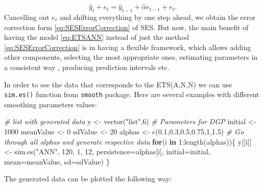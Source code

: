 \documentclass[
]{book}
\newenvironment{Shaded}{\begin{snugshade}}{\end{snugshade}}
\newcommand{\AttributeTok}[1]{\textcolor[rgb]{0.77,0.63,0.00}{#1}}
\newcommand{\CommentTok}[1]{\textcolor[rgb]{0.56,0.35,0.01}{\textit{#1}}}
\newcommand{\ControlFlowTok}[1]{\textcolor[rgb]{0.13,0.29,0.53}{\textbf{#1}}}
\newcommand{\DecValTok}[1]{\textcolor[rgb]{0.00,0.00,0.81}{#1}}
\newcommand{\FloatTok}[1]{\textcolor[rgb]{0.00,0.00,0.81}{#1}}
\newcommand{\FunctionTok}[1]{\textcolor[rgb]{0.00,0.00,0.00}{#1}}
\newcommand{\NormalTok}[1]{#1}
\newcommand{\OtherTok}[1]{\textcolor[rgb]{0.56,0.35,0.01}{#1}}
\newcommand{\SpecialCharTok}[1]{\textcolor[rgb]{0.00,0.00,0.00}{#1}}
\newcommand{\StringTok}[1]{\textcolor[rgb]{0.31,0.60,0.02}{#1}}
\theoremstyle{definition}
\theoremstyle{definition}
\theoremstyle{definition}
\theoremstyle{definition}
\theoremstyle{remark}
\begin{document}
\begin{equation}
    \hat{y}_t + e_t = \hat{y}_{t-1} + \hat{\alpha} e_{t-1} + e_t .
  \label{eq:ETSANNEstimation2}
\end{equation}
Cancelling out \(e_t\) and shifting everything by one step ahead, we obtain the error correction form \eqref{eq:SESErrorCorrection} of SES. But now, the main benefit of having the model \eqref{eq:ETSANN} instead of just the method \eqref{eq:SESErrorCorrection} is in having a flexible framework, which allows adding other components, selecting the most appropriate ones, estimating parameters in a consistent way \citep[see Section 4.3 of][]{SvetunkovSBA}, producing prediction intervals etc.

In order to see the data that corresponds to the ETS(A,N,N) we can use \texttt{sim.es()} function from \texttt{smooth} package. Here are several examples with different smoothing parameters values:

\begin{Shaded}
\begin{Highlighting}[]
\CommentTok{\# list with generated data}
\NormalTok{y }\OtherTok{\textless{}{-}} \FunctionTok{vector}\NormalTok{(}\StringTok{"list"}\NormalTok{,}\DecValTok{6}\NormalTok{)}
\CommentTok{\# Parameters for DGP}
\NormalTok{initial }\OtherTok{\textless{}{-}} \DecValTok{1000}
\NormalTok{meanValue }\OtherTok{\textless{}{-}} \DecValTok{0}
\NormalTok{sdValue }\OtherTok{\textless{}{-}} \DecValTok{20}
\NormalTok{alphas }\OtherTok{\textless{}{-}} \FunctionTok{c}\NormalTok{(}\FloatTok{0.1}\NormalTok{,}\FloatTok{0.3}\NormalTok{,}\FloatTok{0.5}\NormalTok{,}\FloatTok{0.75}\NormalTok{,}\DecValTok{1}\NormalTok{,}\FloatTok{1.5}\NormalTok{)}
\CommentTok{\# Go through all alphas and generate respective data}
\ControlFlowTok{for}\NormalTok{(i }\ControlFlowTok{in} \DecValTok{1}\SpecialCharTok{:}\FunctionTok{length}\NormalTok{(alphas))\{}
\NormalTok{  y[[i]] }\OtherTok{\textless{}{-}} \FunctionTok{sim.es}\NormalTok{(}\StringTok{"ANN"}\NormalTok{, }\DecValTok{120}\NormalTok{, }\DecValTok{1}\NormalTok{, }\DecValTok{12}\NormalTok{, }\AttributeTok{persistence=}\NormalTok{alphas[i],}
                   \AttributeTok{initial=}\NormalTok{initial, }\AttributeTok{mean=}\NormalTok{meanValue, }\AttributeTok{sd=}\NormalTok{sdValue)}
\NormalTok{\}}
\end{Highlighting}
\end{Shaded}

The generated data can be plotted the following way:
\end{document}

